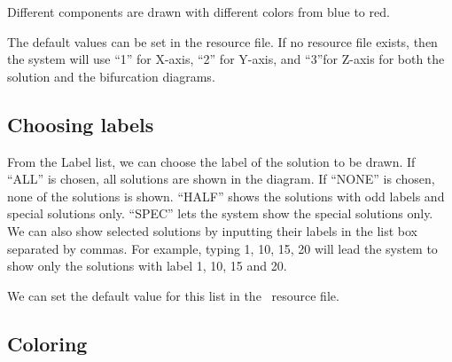 Different components are drawn with different colors from blue to red.

The default values can be set in the resource file. If no resource file exists, then the system
will use ``1'' for X-axis, ``2'' for Y-axis, and ``3''for Z-axis for both the solution and the bifurcation
diagrams.

\subsection{Choosing labels}

From the Label list, we can choose the label of the solution to be drawn. If ``ALL'' is chosen, all
solutions are shown in the diagram. If ``NONE'' is chosen, none of the solutions is shown.
``HALF'' shows the solutions with odd labels and special solutions only. ``SPEC'' lets the system
show the special solutions only.
We can also show selected solutions by inputting their labels in the list
box separated by commas.
For example, typing 1, 10, 15, 20 will lead the system to show only the solutions with label 1, 10, 15 and 20.

We can set the default value for this list in the \PLAUT~resource file.

\subsection{Coloring}

